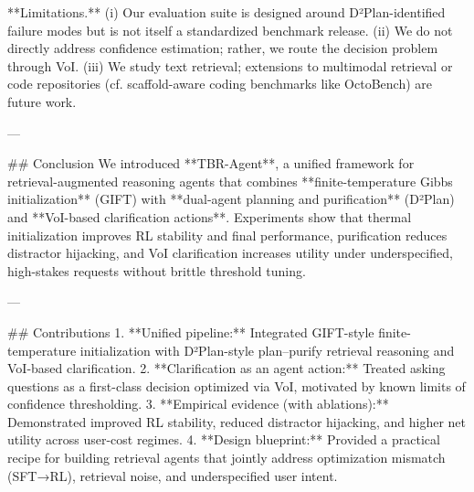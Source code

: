 **Limitations.** (i) Our evaluation suite is designed around D²Plan-identified failure modes but is not itself a standardized benchmark release. (ii) We do not directly address confidence estimation; rather, we route the decision problem through VoI. (iii) We study text retrieval; extensions to multimodal retrieval or code repositories (cf. scaffold-aware coding benchmarks like OctoBench) are future work.  

---

## Conclusion  
We introduced **TBR-Agent**, a unified framework for retrieval-augmented reasoning agents that combines **finite-temperature Gibbs initialization** (GIFT) with **dual-agent planning and purification** (D²Plan) and **VoI-based clarification actions**. Experiments show that thermal initialization improves RL stability and final performance, purification reduces distractor hijacking, and VoI clarification increases utility under underspecified, high-stakes requests without brittle threshold tuning.  

---

## Contributions  
1. **Unified pipeline:** Integrated GIFT-style finite-temperature initialization with D²Plan-style plan–purify retrieval reasoning and VoI-based clarification.  
2. **Clarification as an agent action:** Treated asking questions as a first-class decision optimized via VoI, motivated by known limits of confidence thresholding.  
3. **Empirical evidence (with ablations):** Demonstrated improved RL stability, reduced distractor hijacking, and higher net utility across user-cost regimes.  
4. **Design blueprint:** Provided a practical recipe for building retrieval agents that jointly address optimization mismatch (SFT→RL), retrieval noise, and underspecified user intent.